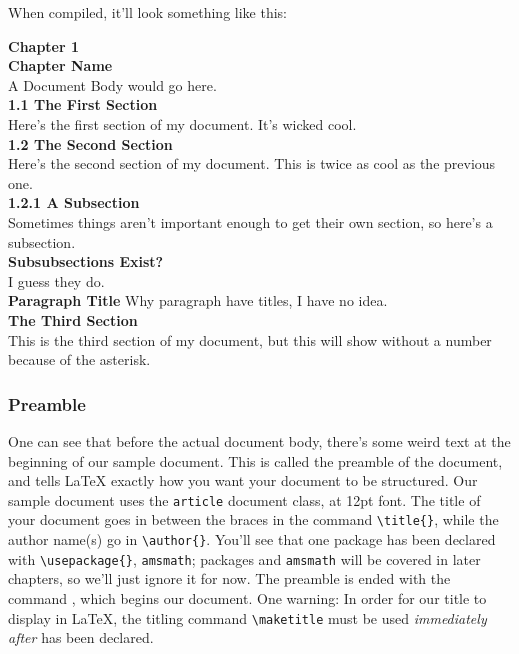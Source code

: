 When compiled, it'll look something like this:
\begin{framed}
  {\noindent\huge \textbf{Chapter 1}} \\[1cm]
  {\Huge \textbf{Chapter Name}} \\[0.25cm]
  A Document Body would go here. \\[0.5cm]
    
  {\noindent\Large \textbf{1.1 \quad The First Section}} \\[0.25cm]
  Here's the first section of my document.
  It's wicked cool. \\[0.5cm]
    
  {\noindent\Large \textbf{1.2 \quad The Second Section}} \\[0.25cm]
  Here's the second section of my document.
  This is twice as cool as the previous one. \\[0.5cm]
    
  {\noindent\large \textbf{1.2.1 \quad A Subsection}} \\[0.25cm]
  Sometimes things aren't important enough to get
  their own section, so here's a subsection. \\[0.5cm]
    
  \noindent\textbf{Subsubsections Exist?} \\[0.25cm]
  I guess they do. \\[0.5cm]
    
  \noindent\textbf{Paragraph Title} \quad Why paragraph have titles, I have no
  idea. \\[0.5cm]
    
  {\noindent\Large \textbf{The Third Section}} \\[0.25cm]
  This is the third section of my document, but this will show without
  a number because of the asterisk.
\end{framed}

\subsubsection{Preamble}
\label{sec:preamble}

One can see that before the actual document body, there's some weird
text at the beginning of our sample document.  This is called the
preamble of the document, and tells \LaTeX{} exactly how you want your
document to be structured.  Our sample document uses the
\texttt{article} document class, at 12pt font.  The title of your
document goes in between the braces in the command \verb=\title{}=,
while the author name(s) go in \verb=\author{}=.  You'll see that one
package has been declared with \verb=\usepackage{}=, \texttt{amsmath};
packages and \texttt{amsmath} will be covered in later chapters, so
we'll just ignore it for now.  The preamble is ended with the command
\verb==, which begins our document.  One warning: In
order for our title to display in \LaTeX{}, the titling command
\verb=\maketitle= must be used \emph{immediately after}
\verb== has been declared.

